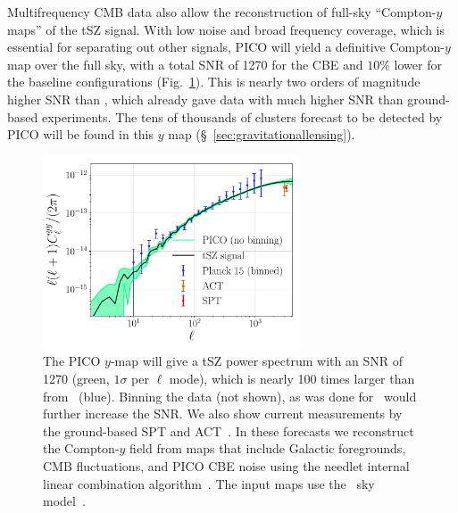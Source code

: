 \documentclass[PICOReport.tex]{subfiles}
\begin{document}

Multifrequency \ac{CMB} data also allow the reconstruction of full-sky ``Compton-$y$ maps'' of the tSZ signal.  With low noise and broad frequency coverage, which is essential for separating out other signals, PICO will yield a definitive Compton-$y$ map over the full sky, with a total \ac{SNR} of 1270 for the CBE and $10$\% lower for the baseline configurations (Fig.~\ref{fig:PICO_tSZ_PS}). This is nearly two orders of magnitude higher \ac{SNR} than \planck , which already gave data with much higher \ac{SNR} than ground-based experiments. The tens of thousands of clusters forecast to be detected by PICO will be found in this $y$ map (\S~\ref{sec:gravitationallensing}).
\begin{figure}[h]
\hspace{-0.1in}
\parbox{3.1in}{\centerline{
\includegraphics[width=3.0in]{images/PICO_tSZ_PS_plot.pdf} } }
\hspace{0.in}
\parbox{3.4in}{
\caption{\captiontext  
The PICO $y$-map will give a tSZ power spectrum with an \ac{SNR} of 1270 (green, $1\sigma$ per $\ell$ mode), which is nearly 100 times larger than from \planck\ (blue). Binning the data (not shown), as was done for \planck\, would further increase the \ac{SNR}.  We also show current measurements by the ground-based SPT and ACT~\citep{Sievers2013,George2015}. In these forecasts we reconstruct the Compton-$y$ field from maps that include Galactic foregrounds, CMB fluctuations, and PICO CBE noise using the needlet internal linear combination algorithm~\citep{Delabrouille2009}. The input maps use the \planck~sky model~\cite{delabrouille/etal:2013}.
\label{fig:PICO_tSZ_PS} } }
\vspace{-0.2in}
\end{figure}
\end{document}
